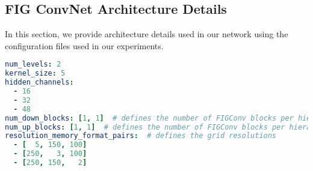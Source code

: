 \subsection{FIG ConvNet Architecture Details}

In this section, we provide architecture details used in our network using the configuration files used in our experiments.


\begin{minipage}{\linewidth}
\begin{lstlisting}[language=yaml, caption=\textbf{FIGConvNet Configuration}, label=lst:figconvnet_config]
num_levels: 2
kernel_size: 5
hidden_channels:
  - 16
  - 32
  - 48
num_down_blocks: [1, 1]  # defines the number of FIGConv blocks per hierarchy in encoder
num_up_blocks: [1, 1]  # defines the number of FIGConv blocks per hierarchy in decoder
resolution_memory_format_pairs:  # defines the grid resolutions
  - [  5, 150, 100]
  - [250,   3, 100]
  - [250, 150,   2]
\end{lstlisting}
\end{minipage}
